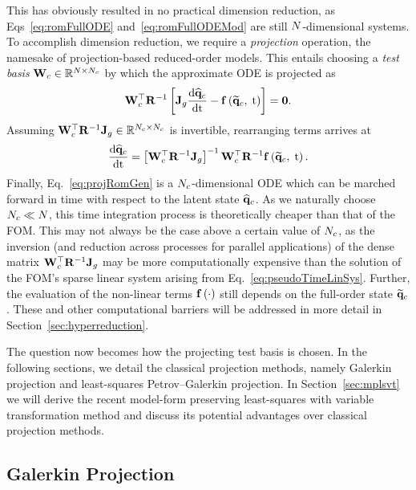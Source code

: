 This has obviously resulted in no practical dimension reduction, as Eqs~\ref{eq:romFullODE} and~\ref{eq:romFullODEMod} are still $N$-dimensional systems. To accomplish dimension reduction, we require a \textit{projection} operation, the namesake of projection-based reduced-order models. This entails choosing a \textit{test basis} $\testBasisCons \inRTwo{\numDOF}{\numConsModes}$ by which the approximate ODE is projected as
%
\begin{equation}\label{eq:contRomRes}
    \testBasisCons^\top \resScaleInv \left[\jacobDecode \ode{\consVecCoef}{\timeVar} - \rhsFunc{\consVecRom, \; \timeVar} \right] = \zeroVec.
\end{equation}
%
Assuming $\testBasisCons^\top \resScaleInv \jacobDecode \inRTwo{\numConsModes}{\numConsModes}$ is invertible, rearranging terms arrives at
%
\begin{equation}\label{eq:projRomGen}
    \ode{\consVecCoef}{\timeVar} = \left[\testBasisCons^\top \resScaleInv \jacobDecode\right]^{-1} \testBasisCons^\top \resScaleInv \rhsFunc{\consVecRom, \; \timeVar}.
\end{equation}
%
Finally, Eq.~\ref{eq:projRomGen} is a $N_c$-dimensional ODE which can be marched forward in time with respect to the latent state $\mathbf{\widehat{q}}_{c}$. As we naturally choose $N_c \ll N$, this time integration process is theoretically cheaper than that of the FOM. This may not always be the case above a certain value of $N_c$, as the inversion (and reduction across processes for parallel applications) of the dense matrix $\testBasisCons^\top \resScaleInv \jacobDecode$ may be more computationally expensive than the solution of the FOM's sparse linear system arising from Eq.~\ref{eq:pseudoTimeLinSys}. Further, the evaluation of the non-linear terms $\mathbf{f} \left(\cdot\right)$ still depends on the full-order state $\mathbf{\widetilde{q}}_{c}$. These and other computational barriers will be addressed in more detail in Section~\ref{sec:hyperreduction}.

The question now becomes how the projecting test basis is chosen. In the following sections, we detail the classical projection methods, namely Galerkin projection and least-squares Petrov--Galerkin projection. In Section~\ref{sec:mplsvt} we will derive the recent model-form preserving least-squares with variable transformation method and discuss its potential advantages over classical projection methods.

\subsection{Galerkin Projection}

